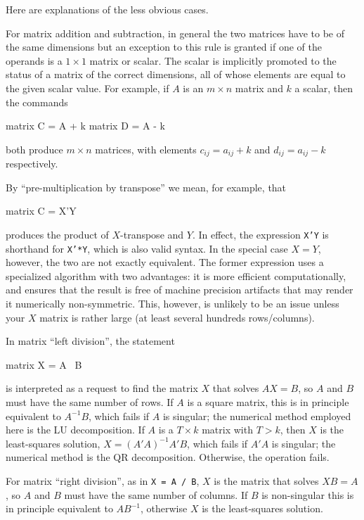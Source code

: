 Here are explanations of the less obvious cases. 

For matrix addition and subtraction, in general the two matrices have
to be of the same dimensions but an exception to this rule is granted
if one of the operands is a $1\times 1$ matrix or scalar.  The scalar
is implicitly promoted to the status of a matrix of the correct
dimensions, all of whose elements are equal to the given scalar value.
For example, if $A$ is an $m \times n$ matrix and $k$ a scalar, then
the commands
%
\begin{code}
matrix C = A + k
matrix D = A - k
\end{code}
%
both produce $m \times n$ matrices, with elements $c_{ij} = 
a_{ij} + k$ and $d_{ij} = a_{ij} - k$ respectively.

By ``pre-multiplication by transpose'' we mean, for example, that 
%
\begin{code}
matrix C = X'Y
\end{code}
%
produces the product of $X$-transpose and $Y$.  In effect, the
expression \texttt{X'Y} is shorthand for \texttt{X'*Y}, which is also
valid syntax. In the special case $X = Y$, however, the two are not
exactly equivalent. The former expression uses a specialized algorithm
with two advantages: it is more efficient computationally, and ensures
that the result is free of machine precision artifacts that may render
it numerically non-symmetric. This, however, is unlikely to be an
issue unless your $X$ matrix is rather large (at least several
hundreds rows/columns).

In matrix ``left division'', the statement 
%
\begin{code}
matrix X = A \ B
\end{code}
%
is interpreted as a request to find the matrix $X$ that solves $AX=B$,
so $A$ and $B$ must have the same number of rows. If $A$ is a square
matrix, this is in principle equivalent to $A^{-1}B$, which fails if
$A$ is singular; the numerical method employed here is the LU
decomposition.  If $A$ is a $T \times k$ matrix with $T > k$, then $X$
is the least-squares solution, $X = (A'A)^{-1}A'B$, which fails if
$A'A$ is singular; the numerical method is the QR decomposition.
Otherwise, the operation fails.

For matrix ``right division'', as in \texttt{X = A / B}, $X$ is the
matrix that solves $XB = A$, so $A$ and $B$ must have the same number
of columns. If $B$ is non-singular this is in principle equivalent to
$AB^{-1}$, otherwise $X$ is the least-squares solution.

